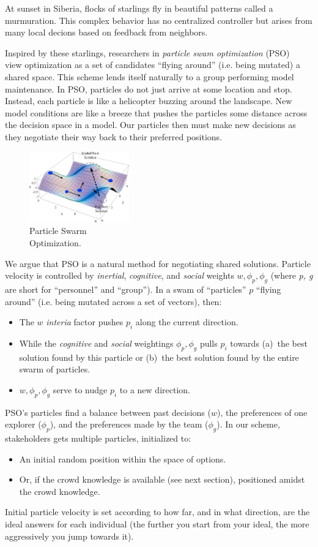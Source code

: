 \documentclass[twoside]{NSF}
\newenvironment{myitemize}
{ \begin{itemize}[topsep=0pt,itemsep=0pt,leftmargin=*]
    \setlength{\itemsep}{0pt}
    \setlength{\parskip}{0pt}
    \setlength{\parsep}{0pt}     }
{ \end{itemize}                  }
\newcommand{\bi}{\begin{myitemize}}
\newcommand{\ei}{\end{myitemize}}
\begin{document}
\begin{nsfdescription}
 
 At sunset in Siberia,
  flocks of starlings   fly
 in beautiful patterns called a murmuration.
 This complex    behavior has no centralized controller but arises from many
  local decions based on   feedback from   neighbors.
 
Inspired by these starlings,
researchers in {\em particle swam optimization} (PSO)~\cite{kennedy95particle} view
optimization   as   a set of candidates
``flying around''
(i.e.   being mutated)  a shared space. 
  This  scheme  lends itself naturally  to a group performing model maintenance. In PSO, particles do not just arrive at some location and stop. Instead, each particle is like a   helicopter buzzing around the landscape. 
 New model conditions are like a breeze that pushes the particles   some distance across the decision space in a model.  Our particles then must make new decisions as they   negotiate their way back to their preferred positions.   
 
 \begin{figure}
  \includegraphics[width=1.7in]{fig/pso1.png}
\caption{Particle Swarm \\Optimization.} \label{pso1}
\end{figure} 
We argue that 
 PSO is  a natural method for negotiating  shared solutions.
Particle velocity   is controlled by     
{\em inertial},   {\em cognitive}, and  
{\em social} weights $w,\phi_p,\phi_g$ 
(where {\em p, g} are short for ``personnel'' and ``group'').
In a swam of ``particles'' $p$ 
 ``flying around''  
(i.e. being mutated across a set of vectors),
then:
\bi
\item
The $w$ 
{\em interia} factor pushes   $p_i$ along the  
current direction. 
\item
While  the {\em cognitive} and 
{\em social} weightings 
$\phi_p,\phi_g$ pulls $p_i$ towards
(a)~the best solution found by this
particle or (b)~the best solution found by the entire
swarm of particles. 
\item
  $w,\phi_p,\phi_g$ serve to  nudge
  $p_i$ to a new direction.\ei
 
 PSO's particles  find a balance between   past decisions ($w$), the preferences of one explorer 
($\phi_p$), and the preferences made by the team ($\phi_g$).
In our scheme,
  stakeholders  gets multiple particles, initialized to:
\bi
\item An initial random  position within the space of options.
\item Or, if the crowd knowledge is available (see next section), 
positioned  amidst the crowd knowledge.
\ei
Initial particle velocity is  set according to how far, and in what direction, are the ideal answers for each individual (the further  you start from your ideal, the more aggressively you jump towards it). 



\end{nsfdescription}
\end{document}
